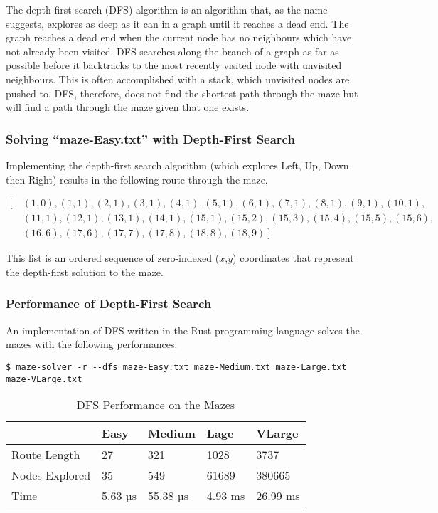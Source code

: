 \documentclass[11pt]{article}
\begin{document}
The depth-first search (DFS) algorithm is an algorithm that, as the name
suggests, explores as deep as it can in a graph until it reaches a dead
end. The graph reaches a dead end when the current node has no
neighbours which have not already been visited. DFS searches along the
branch of a graph as far as possible before it backtracks to the most
recently visited node with unvisited neighbours. This is often
accomplished with a stack, which unvisited nodes are pushed to. DFS,
therefore, does not find the shortest path through the maze but will
find a path through the maze given that one exists.


\subsubsection{Solving ``maze-Easy.txt'' with Depth-First Search}
\label{solving-maze-easy.txt-with-depth-first-search}

Implementing the depth-first search algorithm (which explores Left, Up,
Down then Right) results in the following route through the maze.

\begin{equation*}
\begin{aligned}
        [\ &(1,0), (1,1), (2,1), (3,1), (4,1), (5,1), (6,1), (7,1), (8,1), (9,1), (10,1),\\
        & (11,1), (12,1), (13,1), (14,1), (15,1), (15,2), (15,3), (15,4), (15,5), (15,6),\\
        & (16,6), (17,6), (17,7), (17,8), (18,8), (18,9)\ ]
\end{aligned}
\end{equation*}

This list is an ordered sequence of zero-indexed ($x$,$y$) coordinates that
represent the depth-first solution to the maze.

\subsubsection{Performance of Depth-First Search}
\label{performance-of-depth-first-search}

An implementation of DFS written in the Rust programming language solves
the mazes with the following performances.

\begin{verbatim}
$ maze-solver -r --dfs maze-Easy.txt maze-Medium.txt maze-Large.txt maze-VLarge.txt
\end{verbatim}

\begin{table}[H]
\centering
\begin{tabulary}{1\textwidth}{LLLLL}
\toprule
& Easy & Medium & Lage & VLarge \\
\midrule
Route Length & 27 & 321 & 1028 & 3737 \\
Nodes Explored & 35 & 549 & 61689 & 380665 \\
Time & 5.63 µs & 55.38 µs & 4.93 ms & 26.99 ms \\
\bottomrule
\end{tabulary}
\caption{DFS Performance on the Mazes}
\end{table}
\end{document}
